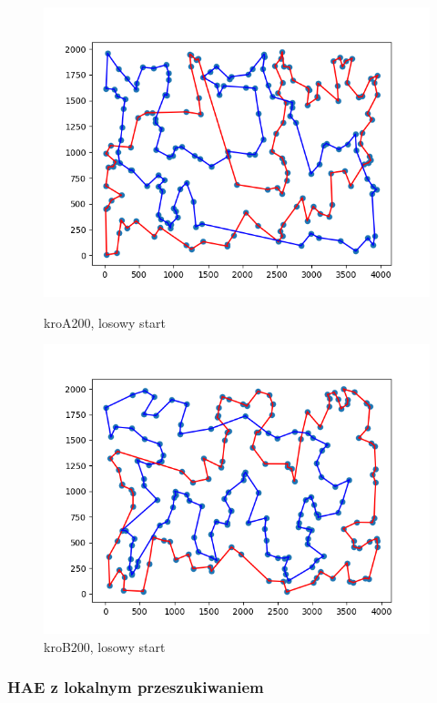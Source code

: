 \documentclass[11pt]{article}
\begin{document}
\begin{figure}[H]
    \begin{minipage}[t]{0.45\textwidth}
        \centering
        \includegraphics[width=\linewidth]{best_paths/kroA200/HAE+Mutation}
        \caption{kroA200, losowy start}
    \end{minipage}
    \hfill
    \begin{minipage}[t]{0.45\textwidth}
        \centering
        \includegraphics[width=\linewidth]{best_paths/kroB200/HAE+Mutation}
        \caption{kroB200, losowy start}
    \end{minipage}\label{fig:figure6}
\end{figure}

\subsubsection{HAE z lokalnym przeszukiwaniem}
\end{document}
